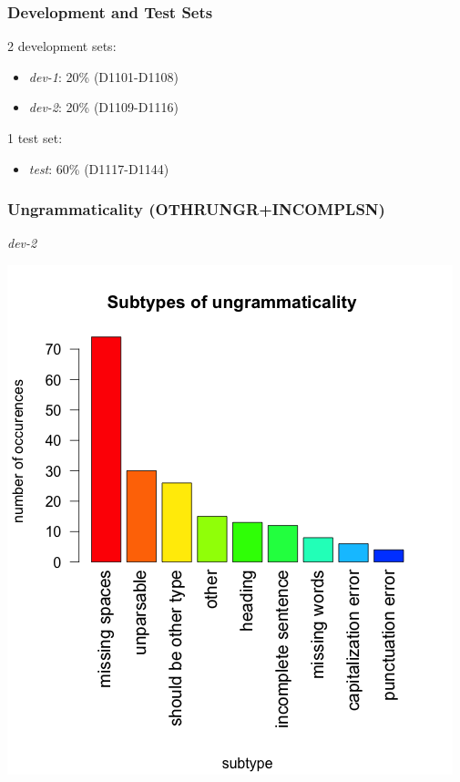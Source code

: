 \documentclass[table]{beamer}
\begin{document}
\begin{frame}
  \frametitle{Development and Test Sets}
  2 development sets:
  \begin{itemize}
    \item \textit{dev-1}: 20\% (D1101-D1108)
    \item \textit{dev-2}: 20\% (D1109-D1116)
  \end{itemize}

  \vspace{1cm}
  1 test set: 
  \begin{itemize}
    \item \textit{test}: 60\% (D1117-D1144)
  \end{itemize}
\end{frame}

\begin{frame}
  \frametitle{Ungrammaticality (OTHRUNGR+INCOMPLSN)}
  \begin{center}
    \textit{dev-2}

    \includegraphics[scale=0.4]{subtypes_dev2.png}
  \end{center}
\end{frame}
\end{document}
